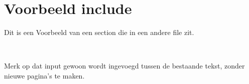 \section*{Voorbeeld include}
    Dit is een Voorbeeld van een section die in een andere file zit.


    \

    Merk op dat input gewoon wordt ingevoegd tussen de bestaande tekst, zonder nieuwe pagina's te maken.
